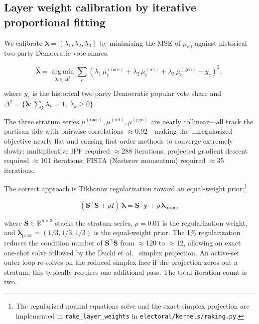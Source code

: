 \documentclass[12pt, letterpaper]{article}
\theoremstyle{definition}
\newcommand{\mueff}{\mu_{\mathrm{eff}}}
\newcommand{\lambdaone}{\lambda_1}
\newcommand{\lambdatwo}{\lambda_2}
\newcommand{\lambdathree}{\lambda_3}
\begin{document}
\subsection{Layer weight calibration by iterative proportional fitting}
\label{sec:raking}

We calibrate $\boldsymbol{\lambda} = (\lambdaone, \lambdatwo, \lambdathree)$
by minimizing the MSE of $\mueff$ against historical two-party Democratic vote
shares:

\begin{equation}
  \hat{\boldsymbol{\lambda}} = \operatorname*{arg\,min}_{\boldsymbol{\lambda} \in \Delta^2}
  \sum_{c} \left(
    \lambdaone\, \bar{\mu}_c^{(\text{race})}
    + \lambdatwo\, \bar{\mu}_c^{(\text{rel})}
    + \lambdathree\, \bar{\mu}_c^{(\text{gen})}
    - y_c
  \right)^2,
  \label{eq:raking_obj}
\end{equation}

where $y_c$ is the historical two-party Democratic popular vote share and
$\Delta^2 = \{\boldsymbol{\lambda} : \sum_k \lambda_k = 1,\ \lambda_k \geq 0\}$.

The three stratum series $\bar{\mu}^{(\text{race})}, \bar{\mu}^{(\text{rel})},
\bar{\mu}^{(\text{gen})}$ are nearly collinear---all track the partisan tide
with pairwise correlations $\approx 0.92$---making the unregularized objective
nearly flat and causing first-order methods to converge extremely slowly:
multiplicative IPF required $\approx$288 iterations; projected gradient descent
required $\approx$101 iterations; FISTA (Nesterov momentum) required
$\approx$35 iterations.

The correct approach is Tikhonov regularization toward an equal-weight
prior:\footnote{The regularized normal-equations solve and the exact-simplex
projection are implemented in \texttt{rake\_layer\_weights} in
\texttt{electoral/kernels/raking.py}.}

\begin{equation}
  \left(\mathbf{S}^\top\mathbf{S} + \rho I\right)\, \boldsymbol{\lambda}
  = \mathbf{S}^\top \mathbf{y} + \rho\, \boldsymbol{\lambda}_{\text{prior}},
  \label{eq:tikhonov}
\end{equation}

where $\mathbf{S} \in \mathbb{R}^{n \times 3}$ stacks the stratum series,
$\rho = 0.01$ is the regularization weight, and
$\boldsymbol{\lambda}_{\text{prior}} = (1/3, 1/3, 1/3)$ is the equal-weight
prior. The 1\% regularization reduces the condition number of
$\mathbf{S}^\top\mathbf{S}$ from $\approx$120 to $\approx$12, allowing an
exact one-shot solve followed by the Duchi et al.\ \citeyear{Duchi2008} simplex
projection. An active-set outer loop re-solves on the reduced simplex face
if the projection zeros out a stratum; this typically requires one additional
pass. The total iteration count is two.
\end{document}
